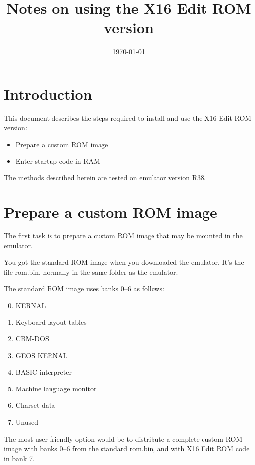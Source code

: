 \documentclass{article}
\title{Notes on using the X16 Edit ROM version}
\date{\today}
\begin{document}
\maketitle

\section{Introduction}

    This document describes the steps required to install and use the X16 Edit ROM version:

    \begin{itemize}
        \item Prepare a custom ROM image
        \item Enter startup code in RAM
    \end{itemize}

    \noindent The methods described herein are tested on emulator version R38.

\section{Prepare a custom ROM image}

    The first task is to prepare a custom ROM image that may be mounted in the emulator.

    You got the standard ROM image when you downloaded the emulator. It's the file
    rom.bin, normally in the same folder as the emulator.

    The standard ROM image uses banks 0--6 as follows:

    \begin{enumerate}
        \setcounter{enumi}{-1}
        \item KERNAL
        \item Keyboard layout tables
        \item CBM-DOS
        \item GEOS KERNAL
        \item BASIC interpreter
        \item Machine language monitor
        \item Charset data
        \item Unused
    \end{enumerate}

    \noindent The most user-friendly option would be to distribute a complete custom ROM image with
    banks 0--6 from the standard rom.bin, and with X16 Edit ROM code in bank 7.
\end{document}
